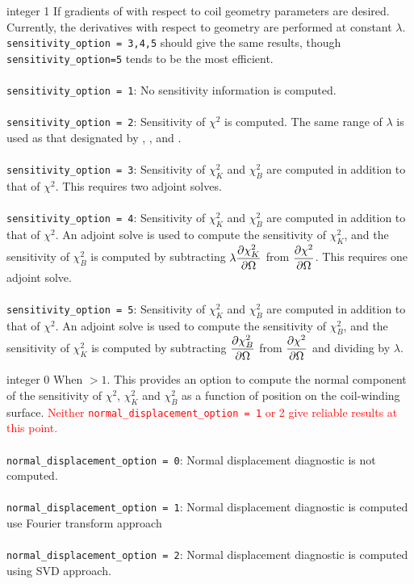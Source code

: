 {integer}
{1}
{If gradients of with respect to coil geometry parameters are desired.}
{\\ Currently, the derivatives with respect to geometry are performed at constant $\lambda$. \texttt{sensitivity\_option = 3,4,5} should give the same results, though \texttt{sensitivity\_option=5} tends to be the most efficient. \\ \\
\texttt{sensitivity\_option = 1}: No sensitivity information is computed. \\ \\
\texttt{sensitivity\_option = 2}: Sensitivity of $\chi^2$ is computed. The same range of $\lambda$ is used as that designated by , , and . \\ \\
\texttt{sensitivity\_option = 3}: Sensitivity of $\chi^2_K$ and $\chi^2_B$ are computed in addition to that of $\chi^2$. This requires two adjoint solves. \\ \\
\texttt{sensitivity\_option = 4}: Sensitivity of $\chi^2_K$ and $\chi^2_B$ are computed in addition to that of $\chi^2$. An adjoint solve is used to compute the sensitivity of $\chi^2_K$, and the sensitivity of $\chi^2_B$ is computed by subtracting $\lambda \dfrac{\partial \chi^2_K}{\partial \Omega}$ from $\dfrac{\partial \chi^2}{\partial \Omega}$. This requires one adjoint solve. \\ \\
\texttt{sensitivity\_option = 5}: Sensitivity of $\chi^2_K$ and $\chi^2_B$ are computed in addition to that of $\chi^2$. An adjoint solve is used to compute the sensitivity of $\chi^2_B$, and the sensitivity of $\chi^2_K$ is computed by subtracting $\dfrac{\partial \chi^2_B}{\partial \Omega}$ from $\dfrac{\partial \chi^2}{\partial \Omega}$ and dividing by $\lambda$. 
}

\myhrule

{integer}
{0}
{When  $>1$.}
{This provides an option to compute the normal component of the sensitivity of $\chi^2$, $\chi^2_K$ and $\chi^2_B$ as a function of position on the coil-winding surface. \textcolor{red}{Neither \texttt{normal\_displacement\_option = 1} or 2 give reliable results at this point.} \\ \\ 
\texttt{normal\_displacement\_option = 0}: Normal displacement diagnostic is not computed. \\ \\
\texttt{normal\_displacement\_option = 1}: Normal displacement diagnostic is computed use Fourier transform approach \\ \\
\texttt{normal\_displacement\_option = 2}: Normal displacement diagnostic is computed using SVD approach.}


